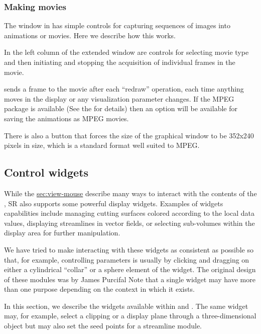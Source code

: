 \subsubsection{Making movies}
\label{sec:view-movies} 

The \viewer{} window in \SR{} has simple controls for capturing sequences
of images into animations or movies.  Here we describe how this works.

In the left column of the extended \viewer{} window are controls for
selecting movie type and then initiating and stopping the acquisition of
individual frames in the movie.

\SR{} sends a frame to the movie after each ``redraw'' operation, \ie{}
each time anything moves in the display or any visualization parameter
changes.  If the MPEG package is available (See the
 for
details) then an option will be available for saving the animations as MPEG
movies.

There is also a button that forces the size of the graphical window to be
352x240 pixels in size, which is a standard format well suited to MPEG.

\subsection{Control widgets}
\label{sec:view-widgets} 

While the \hyperref{mouse controls}{mouse controls in
Section}{}{sec:view-mouse} describe many ways to interact with the contents
of the \viewer{}, SR{} also supports some powerful display widgets.
Examples of widgets capabilities include managing cutting surfaces colored
according to the local data values, displaying streamlines in vector
fields, or selecting sub-volumes within the display area for further
manipulation. 
 
We have tried to make interacting with these widgets as consistent as
possible so that, for example, controlling parameters is usually by clicking
and dragging on either a cylindrical ``collar'' or a sphere element of the
widget.  The original design of these modules was by James Purcifal
Note that a single widget may have more than one purpose
depending on the context in which it exists.

In this section, we describe the widgets available within \SR{} and \BIOPSE{}.
The same widget may, for example, select a clipping or a display plane
through a three-dimensional object but may also set the seed points for a
streamline module.  

